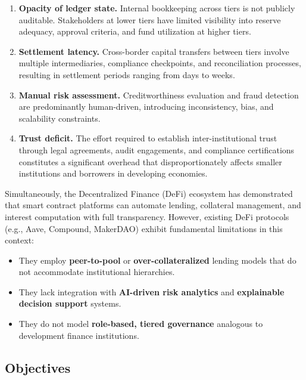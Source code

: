 \documentclass[11pt,a4paper]{article}
\begin{document}
\begin{enumerate}[noitemsep]
\item \textbf{Opacity of ledger state.} Internal bookkeeping across tiers is not publicly auditable. Stakeholders at lower tiers have limited visibility into reserve adequacy, approval criteria, and fund utilization at higher tiers.

\item \textbf{Settlement latency.} Cross-border capital transfers between tiers involve multiple intermediaries, compliance checkpoints, and reconciliation processes, resulting in settlement periods ranging from days to weeks.

\item \textbf{Manual risk assessment.} Creditworthiness evaluation and fraud detection are predominantly human-driven, introducing inconsistency, bias, and scalability constraints.

\item \textbf{Trust deficit.} The effort required to establish inter-institutional trust through legal agreements, audit engagements, and compliance certifications constitutes a significant overhead that disproportionately affects smaller institutions and borrowers in developing economies.
\end{enumerate}

Simultaneously, the Decentralized Finance (DeFi) ecosystem has demonstrated that smart contract platforms can automate lending, collateral management, and interest computation with full transparency. However, existing DeFi protocols (e.g., Aave, Compound, MakerDAO) exhibit fundamental limitations in this context:

\begin{itemize}[noitemsep]
\item They employ \textbf{peer-to-pool} or \textbf{over-collateralized} lending models that do not accommodate institutional hierarchies.
\item They lack integration with \textbf{AI-driven risk analytics} and \textbf{explainable decision support} systems.
\item They do not model \textbf{role-based, tiered governance} analogous to development finance institutions.
\end{itemize}

\subsection{Objectives}
\end{document}
